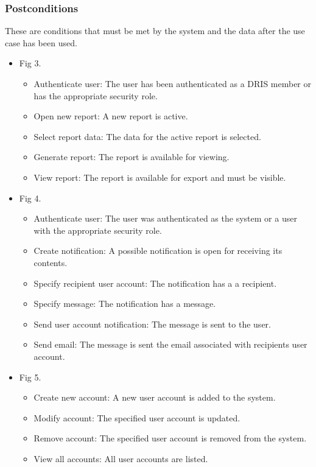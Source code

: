 \documentclass[12pt]{article}
\begin{document}
\subsubsection{Postconditions}
These are conditions that must be met by the system and the data after the use case has been used.\\
\begin{itemize}
		
	\item Fig 3.
		\begin{itemize}
			\item Authenticate user: The user has been authenticated as a DRIS member or has the appropriate security role.
			\item Open new report: A new report is active.
			\item Select report data: The data for the active report is selected.
			\item Generate report: The report is available for viewing.
			\item View report: The report is available for export and must be visible.	
		\end{itemize}
	
	\item Fig 4.
		\begin{itemize}
			\item Authenticate user: The user was authenticated as the system or a user with the appropriate security role.
			\item Create notification: A possible notification is open for receiving its contents.
			\item Specify recipient user account: The notification has a a recipient.				
			\item Specify message: The notification has a message.
			\item Send user account notification: The message is sent to the user.
			\item Send email: The message is sent the email associated with recipients user account.	
		\end{itemize}
	
	\item Fig 5.
		\begin{itemize}
			\item Create new account: A new user account is added to the system.
			\item Modify account: The specified user account is updated.				
			\item Remove account: The specified user account is removed from the system.
			\item View all accounts: All user accounts are listed.						
		\end{itemize}
	

\end{itemize}
\end{document}
